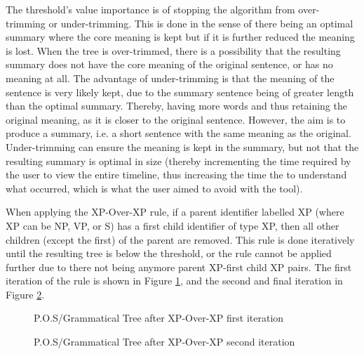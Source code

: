 \par The threshold's value importance is of stopping the algorithm from over-trimming or under-trimming. This is done in the sense of there being an optimal summary where the core meaning is kept but if it is further reduced the meaning is lost. When the tree is over-trimmed, there is a possibility that the resulting summary does not have the core meaning of the original sentence, or has no meaning at all. The advantage of under-trimming is that the meaning of the sentence is very likely kept, due to the summary sentence being of greater length than the optimal summary. Thereby, having more words and thus retaining the original meaning, as it is closer to the original sentence. However, the aim is to produce a summary, i.e. a short sentence with the same meaning as the original. Under-trimming can ensure the meaning is kept in the summary, but not that the resulting summary is optimal in size (thereby incrementing the time required by the user to view the entire timeline, thus increasing the time the to understand what occurred, which is what the user aimed to avoid with the tool).
\par When applying the XP-Over-XP rule, if a parent identifier labelled XP (where XP can be NP, VP, or S) has a first child identifier of type XP, then all other children (except the first) of the parent are removed. This rule is done iteratively until the resulting tree is below the threshold, or the rule cannot be applied further due to there not being anymore parent XP-first child XP pairs. The first iteration of the rule is shown in Figure \ref{tree:xpOverXpFirst}, and the second and final iteration in Figure \ref{tree:xpOverXpSecond}.
\begin{figure}[H]
\caption{P.O.S/Grammatical Tree after XP-Over-XP first iteration}
\label{tree:xpOverXpFirst}
\end{figure}
\begin{figure}[H]
\caption{P.O.S/Grammatical Tree after XP-Over-XP second iteration}
\label{tree:xpOverXpSecond}
\end{figure}
